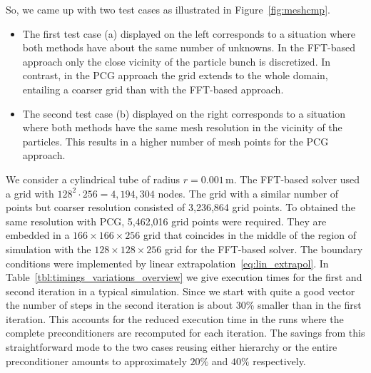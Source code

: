 \documentclass[a4paper,10pt,3p,final,pdftex]{elsarticle}
\begin{document}
So, we came up with two test cases as illustrated in
Figure~\ref{fig:meshcmp}.
\begin{itemize}
\item The first test case (a) displayed on the left corresponds to a
  situation where both methods have about the same number of unknowns.
  In the FFT-based approach only the close vicinity of the particle
  bunch is discretized.  In contrast, in the PCG approach the grid
  extends to the whole domain, entailing a coarser grid than with the
  FFT-based approach.

\item The second test case (b) displayed on the right corresponds to a
  situation where both methods have the same mesh resolution in the
  vicinity of the particles.  This results in a higher number of mesh
  points for the PCG approach.
\end{itemize}

We consider a cylindrical tube of radius $r=0.001$\,m.  The FFT-based
solver used a grid with $128^2\cdot256=4,194,304$ nodes.  The grid with
a similar number of points but coarser resolution consisted of 3,236,864
grid points.  To obtained the same resolution with PCG, 5,462,016 grid
points were required.  They are embedded in a $166\times166\times256$
grid that coincides in the middle of the region of simulation with the
$128\times128\times256$ grid for the FFT-based solver.  The boundary
conditions were implemented by linear
extrapolation~\eqref{eq:lin_extrapol}.  In
Table~\ref{tbl:timings_variations_overview} we give execution times for
the first and second iteration in a typical simulation.  Since we start
with quite a good vector the number of steps in the second iteration is
about 30\% smaller than in the first iteration.  This accounts for the
reduced execution time in the runs where the complete preconditioners
are recomputed for each iteration.  The savings from this
straightforward mode to the two cases reusing either hierarchy or the
entire preconditioner amounts to approximately $20\%$ and $40\%$
respectively.
\end{document}
